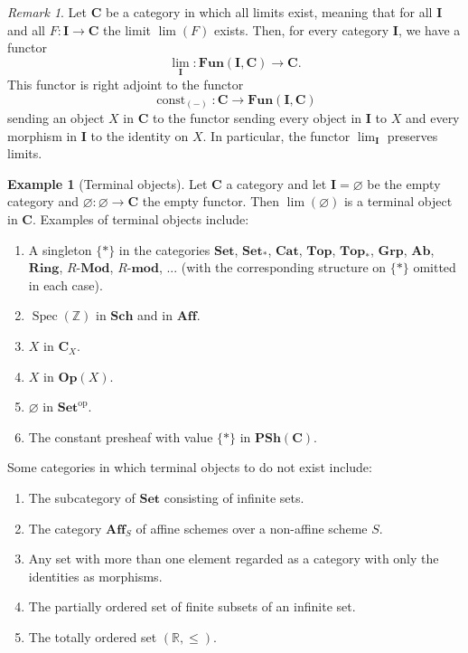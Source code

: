 \documentclass[12pt,reqno,a4paper]{amsart}
\theoremstyle{plain}
\theoremstyle{definition}
\newtheorem{exmp}[thm]{Example}
\theoremstyle{remark}
\newtheorem{rem}[thm]{Remark}
\begin{document}
\begin{rem}
  Let $\mathbf{C}$ be a category in which all limits exist, meaning that for all $\mathbf{I}$ and all $F \colon \mathbf{I} \to \mathbf{C}$ the limit $\lim(F)$ exists.
  Then, for every category $\mathbf{I}$, we have a functor
  \[ \lim_{\mathbf{I}} \colon \mathbf{Fun}(\mathbf{I}, \mathbf{C}) \to \mathbf{C}. \]
  This functor is right adjoint to the functor
  \[ \operatorname{const}_{(-)} \colon \mathbf{C} \to \mathbf{Fun}(\mathbf{I}, \mathbf{C}) \]
  sending an object $X$ in $\mathbf{C}$ to the functor sending every object in $\mathbf{I}$ to $X$ and every morphism in $\mathbf{I}$ to the identity on $X$.
  In particular, the functor $\operatorname{lim}_{\mathbf{I}}$ preserves limits.
\end{rem}

\begin{exmp}[Terminal objects]
  Let $\mathbf{C}$ a category and let $\mathbf{I} = \varnothing$ be the empty category and $\varnothing \colon \varnothing \to \mathbf{C}$ the empty functor.
  Then $\lim(\varnothing)$ is a terminal object in $\mathbf{C}$.
  Examples of terminal objects include:
  \begin{enumerate}
    \item A singleton $\{ * \}$ in the categories $\mathbf{Set}$, $\mathbf{Set}_{*}$, $\mathbf{Cat}$, $\mathbf{Top}$, $\mathbf{Top}_{*}$, $\mathbf{Grp}$, $\mathbf{Ab}$, $\mathbf{Ring}$, $R$-$\mathbf{Mod}$, $R$-$\mathbf{mod}$, ... (with the corresponding structure on $\{ * \}$ omitted in each case).
    \item $\operatorname{Spec}(\mathbb{Z})$ in $\mathbf{Sch}$ and in $\mathbf{Aff}$.
    \item $X$ in $\mathbf{C}_{X}$.
    \item $X$ in $\mathbf{Op}(X)$.
    \item $\varnothing$ in $\mathbf{Set}^{\mathrm{op}}$.
    \item The constant presheaf with value $\{ * \}$ in $\mathbf{PSh}(\mathbf{C})$.
  \end{enumerate}
  Some categories in which terminal objects to do not exist include:
  \begin{enumerate}
    \item The subcategory of $\mathbf{Set}$ consisting of infinite sets.
    \item The category $\mathbf{Aff}_{S}$ of affine schemes over a non-affine scheme $S$.
    \item Any set with more than one element regarded as a category with only the identities as morphisms.
    \item The partially ordered set of finite subsets of an infinite set.
    \item The totally ordered set $(\mathbb{R},\leq)$.
  \end{enumerate}
\end{exmp}
\end{document}
